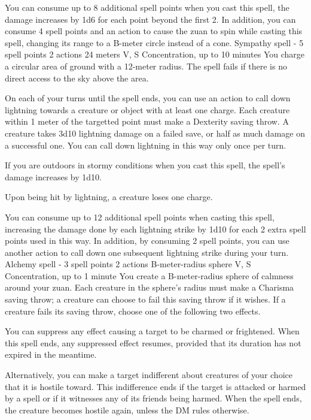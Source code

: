     You can consume up to 8 additional spell points when you cast this spell, the damage increases by 1d6 for each point beyond the first 2.
    In addition, you can consume 4 spell points and an action to cause the zuan to spin while casting this spell, changing its range to a B-meter circle instead of a cone.
    {Sympathy spell - 5 spell points}
    {2 actions}
    {24 meters}
    {V, S}
    {Concentration, up to 10 minutes}
    You charge a circular area of ground with a 12-meter radius.
    The spell fails if there is no direct access to the sky above the area.

    On each of your turns until the spell ends, you can use an action to call down lightning towards a creature or object with at least one charge.
    Each creature within 1 meter of the targetted point must make a Dexterity saving throw.
    A creature takes 3d10 lightning damage on a failed save, or half as much damage on a successful one.
    You can call down lightning in this way only once per turn.

    If you are outdoors in stormy conditions when you cast this spell, the spell's damage increases by 1d10.

    Upon being hit by lightning, a creature loses one charge.

    You can consume up to 12 additional spell points when casting this spell, increasing the damage done by each lightning strike by 1d10 for each 2 extra spell points used in this way.
    In addition, by consuming 2 spell points, you can use another action to call down one subsequent lightning strike during your turn.
    {Alchemy spell - 3 spell points}
    {2 actions}
    {B-meter-radius sphere}
    {V, S}
    {Concentration, up to 1 minute}
    You create a B-meter-radius sphere of calmness around your zuan.
    Each creature in the sphere's radius must make a Charisma saving throw; a creature can choose to fail this saving throw if it wishes.
    If a creature fails its saving throw, choose one of the following two effects.

    You can suppress any effect causing a target to be charmed or frightened.
    When this spell ends, any suppressed effect resumes, provided that its duration has not expired in the meantime.

    Alternatively, you can make a target indifferent about creatures of your choice that it is hostile toward.
    This indifference ends if the target is attacked or harmed by a spell or if it witnesses any of its friends being harmed.
    When the spell ends, the creature becomes hostile again, unless the DM rules otherwise.

